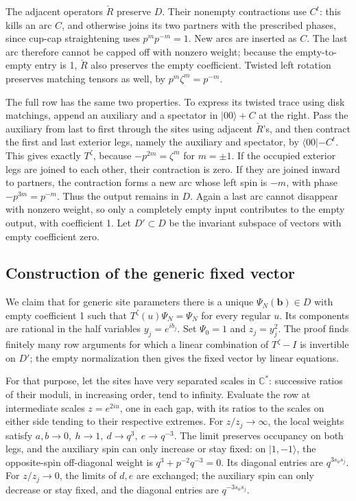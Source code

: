 The adjacent operators \(\check R\) preserve \(D\). Their nonempty contractions use \(C^t\): this kills an arc \(C\), and otherwise joins its two partners with the prescribed phases, since cup-cap straightening uses \(p^m p^{-m}=1\). New arcs are inserted as \(C\). The last arc therefore cannot be capped off with nonzero weight; because the empty-to-empty entry is 1, \(\check R\) also preserves the empty coefficient. Twisted left rotation preserves matching tensors as well, by \(p^m\zeta^m=p^{-m}\).

The full row has the same two properties. To express its twisted trace using disk matchings, append an auxiliary and a spectator in \(|00\rangle+C\) at the right. Pass the auxiliary from last to first through the sites using adjacent \(\check R\)'s, and then contract the first and last exterior legs, namely the auxiliary and spectator, by \(\langle00|-C^t\). This gives exactly \(T^\zeta\), because \(-p^{2m}=\zeta^m\) for \(m=\pm1\). If the occupied exterior legs are joined to each other, their contraction is zero. If they are joined inward to partners, the contraction forms a new arc whose left spin is \(-m\), with phase \(-p^{3m}=p^{-m}\). Thus the output remains in \(D\). Again a last arc cannot disappear with nonzero weight, so only a completely empty input contributes to the empty output, with coefficient 1. Let \(D'\subset D\) be the invariant subspace of vectors with empty coefficient zero.

\subsection{Construction of the generic fixed vector}

We claim that for generic site parameters there is a unique \(\Psi_N(\mathbf b)\in D\) with empty coefficient 1 such that \(T^\zeta(u)\Psi_N=\Psi_N\) for every regular \(u\). Its components are rational in the half variables \(y_j=e^{ib_j}\). Set \(\Psi_0=1\) and \(z_j=y_j^2\). The proof finds finitely many row arguments for which a linear combination of \(T^\zeta-I\) is invertible on \(D'\); the empty normalization then gives the fixed vector by linear equations.

For that purpose, let the sites have very separated scales in \(\mathbb C^*\): successive ratios of their moduli, in increasing order, tend to infinity. Evaluate the row at intermediate scales \(z=e^{2iu}\), one in each gap, with its ratios to the scales on either side tending to their respective extremes. For \(z/z_j\to\infty\), the local weights satisfy \(a,b\to0,\ h\to1,\ d\to q^3,\ e\to q^{-3}\). The limit preserves occupancy on both legs, and the auxiliary spin can only increase or stay fixed: on \(|1,-1\rangle\), the opposite-spin off-diagonal weight is \(q^3+p^{-2}q^{-3}=0\). Its diagonal entries are \(q^{3s_a s_j}\). For \(z/z_j\to0\), the limits of \(d,e\) are exchanged; the auxiliary spin can only decrease or stay fixed, and the diagonal entries are \(q^{-3s_a s_j}\).

